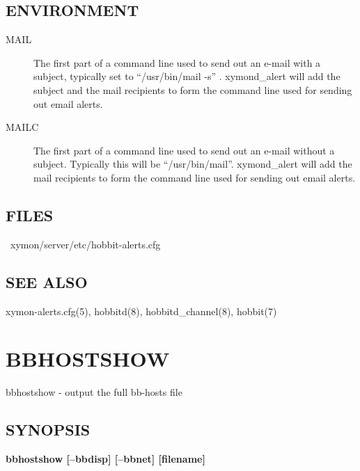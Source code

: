  


 
\subsection{ENVIRONMENT}
\begin{description}
\item[MAIL] The first part of a command line used to send out an
  e-mail with a subject, typically set to ``/usr/bin/mail -s''
  . xymond\_alert will add the subject and the mail recipients to
  form the command line used for sending out email alerts. 


 

\item[MAILC] The first part of a command line used to send out an
  e-mail without a subject. Typically this will be
  ``/usr/bin/mail''. xymond\_alert will add the mail recipients to
  form the command line used for sending out email alerts. 


 
\end{description}
\subsection{FILES}
\begin{description}
\item[~xymon/server/etc/hobbit-alerts.cfg]


\end{description}
\subsection{SEE ALSO}
xymon-alerts.cfg(5), hobbitd(8), hobbitd\_channel(8), hobbit(7) 

 
%
\newpage
\section{BBHOSTSHOW}

 bbhostshow - output the full bb-hosts file 
\subsection{SYNOPSIS}
\textbf{bbhostshow [--bbdisp] [--bbnet] [filename]}


